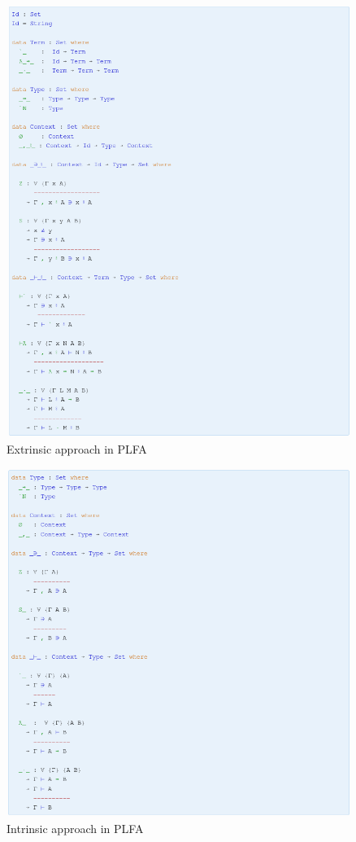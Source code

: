 \documentclass[preprint,authoryear]{elsarticle}
\begin{document}
\begin{figure}[p]
  \includegraphics[width=\textwidth]{figures/raw.png}
  \caption{Extrinsic approach in PLFA}
  \label{fig:extrinsic}
\end{figure}  

\begin{figure}[t]
  \includegraphics[width=\textwidth]{figures/inherent.png}
  \caption{Intrinsic approach in PLFA}
  \label{fig:intrinsic}
\end{figure}  
\end{document}
